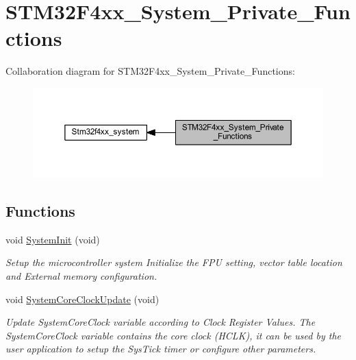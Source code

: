 \hypertarget{group___s_t_m32_f4xx___system___private___functions}{}\section{S\+T\+M32\+F4xx\+\_\+\+System\+\_\+\+Private\+\_\+\+Functions}
\label{group___s_t_m32_f4xx___system___private___functions}
Collaboration diagram for S\+T\+M32\+F4xx\+\_\+\+System\+\_\+\+Private\+\_\+\+Functions\+:
\nopagebreak
\begin{figure}[H]
\begin{center}
\leavevmode
\includegraphics[width=350pt]{group___s_t_m32_f4xx___system___private___functions}
\end{center}
\end{figure}
\subsection*{Functions}
\begin{DoxyCompactItemize}
\item 
void \mbox{\hyperlink{group___s_t_m32_f4xx___system___private___functions_ga93f514700ccf00d08dbdcff7f1224eb2}{System\+Init}} (void)
\begin{DoxyCompactList}\small\item\em Setup the microcontroller system Initialize the F\+PU setting, vector table location and External memory configuration. \end{DoxyCompactList}\item 
void \mbox{\hyperlink{group___s_t_m32_f4xx___system___private___functions_gae0c36a9591fe6e9c45ecb21a794f0f0f}{System\+Core\+Clock\+Update}} (void)
\begin{DoxyCompactList}\small\item\em Update System\+Core\+Clock variable according to Clock Register Values. The System\+Core\+Clock variable contains the core clock (H\+C\+LK), it can be used by the user application to setup the Sys\+Tick timer or configure other parameters. \end{DoxyCompactList}\end{DoxyCompactItemize}


